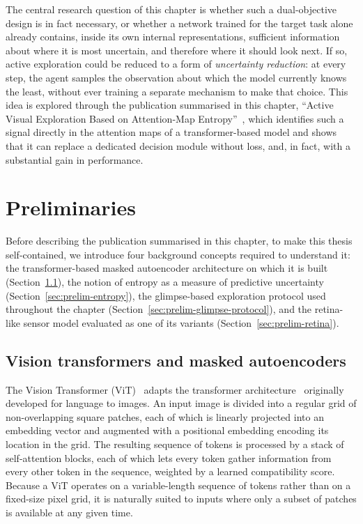 The central research question of this chapter is whether such a dual-objective design is in fact necessary, or whether a network trained for the target task alone already contains, inside its own internal representations, sufficient information about where it is most uncertain, and therefore where it should look next. If so, active exploration could be reduced to a form of \emph{uncertainty reduction}: at every step, the agent samples the observation about which the model currently knows the least, without ever training a separate mechanism to make that choice. This idea is explored through the publication summarised in this chapter, ``Active Visual Exploration Based on Attention-Map Entropy''~, which identifies such a signal directly in the attention maps of a transformer-based model and shows that it can replace a dedicated decision module without loss, and, in fact, with a substantial gain in performance.

\section{Preliminaries}
\label{sec:uncertainty-preliminaries}

Before describing the publication summarised in this chapter, to make this thesis self-contained, we introduce four background concepts required to understand it: the transformer-based masked autoencoder architecture on which it is built (Section~\ref{sec:prelim-vit-mae}), the notion of entropy as a measure of predictive uncertainty (Section~\ref{sec:prelim-entropy}), the glimpse-based exploration protocol used throughout the chapter (Section~\ref{sec:prelim-glimpse-protocol}), and the retina-like sensor model evaluated as one of its variants (Section~\ref{sec:prelim-retina}).

\subsection{Vision transformers and masked autoencoders}
\label{sec:prelim-vit-mae}

The Vision Transformer (ViT)~\cite{dosovitskiy2021image} adapts the transformer architecture~\cite{vaswani2017attention} originally developed for language to images. An input image is divided into a regular grid of non-overlapping square patches, each of which is linearly projected into an embedding vector and augmented with a positional embedding encoding its location in the grid. The resulting sequence of tokens is processed by a stack of self-attention blocks, each of which lets every token gather information from every other token in the sequence, weighted by a learned compatibility score. Because a ViT operates on a variable-length sequence of tokens rather than on a fixed-size pixel grid, it is naturally suited to inputs where only a subset of patches is available at any given time.

